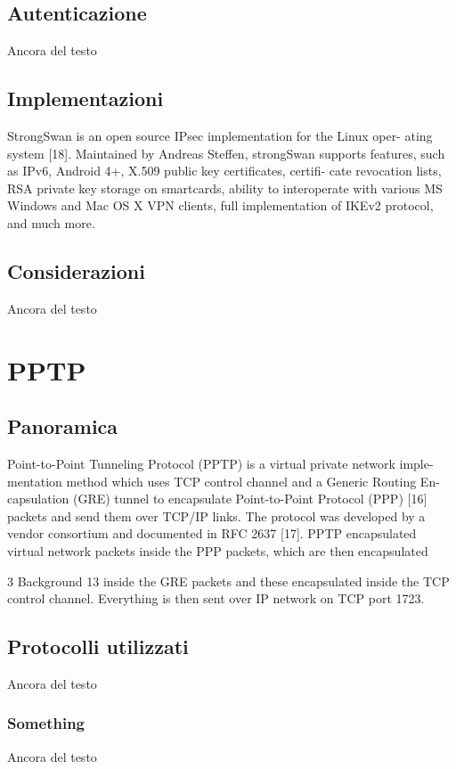 \subsection{Autenticazione}
Ancora del testo

\subsection{Implementazioni}
StrongSwan is an open source IPsec implementation for the Linux oper- ating system [18]. Maintained by Andreas Steffen, strongSwan supports features, such as IPv6, Android 4+, X.509 public key certificates, certifi- cate revocation lists, RSA private key storage on smartcards, ability to interoperate with various MS Windows and Mac OS X VPN clients, full implementation of IKEv2 protocol, and much more.

\subsection{Considerazioni}
Ancora del testo

\section{PPTP}
\subsection{Panoramica}
Point-to-Point Tunneling Protocol (PPTP) is a virtual private network imple- mentation method which uses TCP control channel and a Generic Routing En- capsulation (GRE) tunnel to encapsulate Point-to-Point Protocol (PPP) [16] packets and send them over TCP/IP links. The protocol was developed by a vendor consortium and documented in RFC 2637 [17]. PPTP encapsulated virtual network packets inside the PPP packets, which are then encapsulated

3 Background 13
inside the GRE packets and these encapsulated inside the TCP control channel. Everything is then sent over IP network on TCP port 1723.
\subsection{Protocolli utilizzati}
Ancora del testo

\subsubsection{Something}
Ancora del testo

